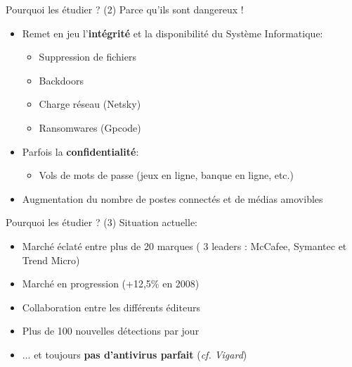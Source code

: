 \documentclass{beamer}
\begin{document}
\begin{frame}{Pourquoi les étudier ? (2)}
Parce qu'ils sont dangereux !
\begin{itemize}
\item Remet en jeu l'\textbf{intégrité} et la {disponibilité} du Système Informatique:
\begin{itemize}
\item Suppression de fichiers
\item Backdoors
\item Charge réseau (Netsky)
\item Ransomwares (Gpcode)
\end{itemize}
\item Parfois la \textbf{confidentialité}:
\begin{itemize}
\item Vols de mots de passe (jeux en ligne, banque en ligne, etc.)
\end{itemize}
\item Augmentation du nombre de postes connectés et de médias amovibles
\end{itemize}
\end{frame}

\begin{frame}{Pourquoi les étudier ? (3)}
Situation actuelle:
\begin{itemize}
\item Marché éclaté entre plus de 20 marques ( 3 leaders : McCafee, Symantec et Trend Micro)
\item Marché en progression (+12,5\% en 2008)
\item Collaboration entre les différents éditeurs
\item Plus de 100 nouvelles détections par jour
\item ... et toujours \textbf{pas d'antivirus parfait} (\textit{cf. Vigard})
\end{itemize}
\end{frame}
\end{document}
